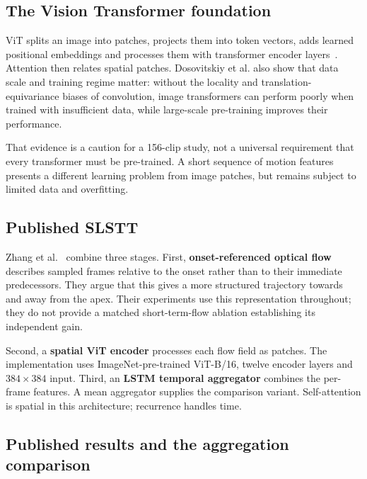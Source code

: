 \subsection{The Vision Transformer foundation}
\label{sec:transformer-vit}

ViT splits an image into patches, projects them into token vectors, adds learned positional embeddings and processes them with transformer encoder layers~\cite{dosovitskiy2021}. Attention then relates spatial patches. Dosovitskiy et al. also show that data scale and training regime matter: without the locality and translation-equivariance biases of convolution, image transformers can perform poorly when trained with insufficient data, while large-scale pre-training improves their performance.

That evidence is a caution for a 156-clip study, not a universal requirement that every transformer must be pre-trained. A short sequence of motion features presents a different learning problem from image patches, but remains subject to limited data and overfitting.

\subsection{Published SLSTT}
\label{sec:slstt-architecture}

Zhang et al.~\cite{zhang2022} combine three stages. First, \textbf{onset-referenced optical flow} describes sampled frames relative to the onset rather than to their immediate predecessors. They argue that this gives a more structured trajectory towards and away from the apex. Their experiments use this representation throughout; they do not provide a matched short-term-flow ablation establishing its independent gain.

Second, a \textbf{spatial ViT encoder} processes each flow field as patches. The implementation uses ImageNet-pre-trained ViT-B/16, twelve encoder layers and $384\times384$ input. Third, an \textbf{LSTM temporal aggregator} combines the per-frame features. A mean aggregator supplies the comparison variant. Self-attention is spatial in this architecture; recurrence handles time.

\subsection{Published results and the aggregation comparison}
\label{sec:slstt-results}

